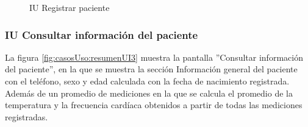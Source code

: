 \begin{figure}[htpb!]
	\begin{center}
		\caption{IU Registrar paciente \label{fig:casosUso:resumenUI2}}
	\end{center}
\end{figure}


\subsubsection{IU Consultar información del paciente}
La figura \ref{fig:casosUso:resumenUI3} muestra la pantalla ''Consultar información del paciente'', en la que se muestra la sección Información general del paciente con el teléfono, sexo y edad calculada con la fecha de nacimiento registrada. Además de un promedio de mediciones en la que se calcula el promedio de la temperatura y la frecuencia cardíaca obtenidos a partir de todas las mediciones registradas.


